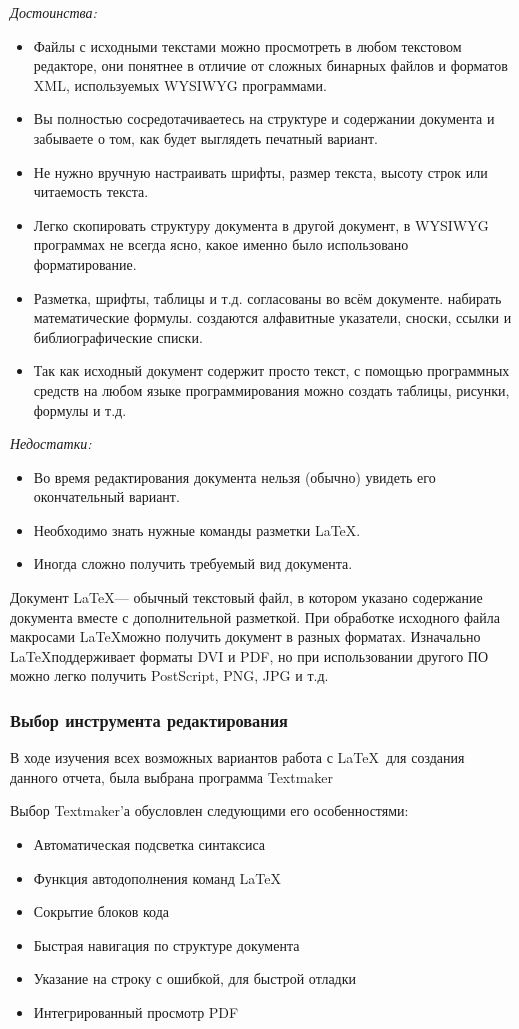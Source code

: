 \documentclass{article}
\begin{document}
	\textit{Достоинства:}
	\begin{itemize}
   		\item Файлы с исходными текстами можно просмотреть в любом текстовом редакторе, они понятнее в отличие от сложных бинарных файлов и форматов XML, используемых WYSIWYG программами.
   		\item Вы полностью сосредотачиваетесь на структуре и содержании документа и забываете о том, как будет выглядеть печатный вариант.
   		\item Не нужно вручную настраивать шрифты, размер текста, высоту строк или читаемость текста.
   		\item Легко скопировать структуру документа в другой документ, в WYSIWYG программах не всегда ясно, какое именно было использовано форматирование.
   		\item Разметка, шрифты, таблицы и т.д. согласованы во всём документе.
    	 набирать математические формулы.
    	 создаются алфавитные указатели, сноски, ссылки и библиографические списки.
   		\item Так как исходный документ содержит просто текст, с помощью программных средств на любом языке программирования можно создать таблицы, рисунки, формулы и т.д.
	\end{itemize}	
	\textit{Недостатки:}
	\begin{itemize}
		\item Во время редактирования документа нельзя (обычно) увидеть его окончательный вариант.
   		\item Необходимо знать нужные команды разметки \LaTeX.
   		\item Иногда сложно получить требуемый вид документа.
	\end{itemize}
	Документ \LaTeX — обычный текстовый файл, в котором указано содержание документа вместе с дополнительной разметкой. При обработке исходного файла макросами \LaTeX можно получить документ в разных форматах. Изначально \LaTeX поддерживает форматы DVI и PDF, но при использовании другого ПО можно легко получить PostScript, PNG, JPG и т.д.

		\subsubsection{Выбор инструмента редактирования}
			В ходе изучения всех возможных вариантов работа с \LaTeX ~для создания данного отчета, была выбрана программа Textmaker
			
			Выбор Textmaker'а обусловлен следующими его особенностями:
			\begin{itemize} 
	    		\item	Автоматическая подсветка синтаксиса
	    		\item	Функция автодополнения команд \LaTeX
	    		\item	Сокрытие блоков кода 
	    		\item	Быстрая навигация по структуре документа
	    		\item	Указание на строку с ошибкой, для быстрой отладки
	    		\item	Интегрированный просмотр PDF
			\end{itemize} 
	\newpage
\end{document}
